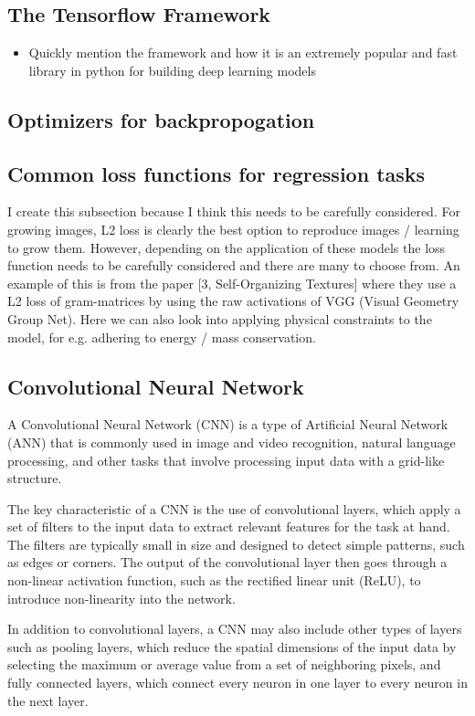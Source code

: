 \subsection{The Tensorflow Framework}
\begin{itemize}
	\item Quickly mention the framework and how it is an extremely popular and fast library in python for building deep learning models
\end{itemize}
\subsection{Optimizers for backpropogation}
\subsection{Common loss functions for regression tasks}
I create this subsection because I think this needs to be carefully considered. For growing images, L2
loss is clearly the best option to reproduce images / learning to grow them. However, depending on
the application of these models the loss function needs to be carefully considered and there are many
to choose from. An example of this is from the paper [3, Self-Organizing Textures] where they use a
L2 loss of gram-matrices by using the raw activations of VGG (Visual Geometry Group Net).
Here we can also look into applying physical constraints to the model, for e.g. adhering to energy
/ mass conservation.
\subsection{Convolutional Neural Network}

A Convolutional Neural Network (CNN) is a type of Artificial Neural Network (ANN) that is commonly used in image and video recognition, natural language processing, and other tasks that involve processing input data with a grid-like structure.

The key characteristic of a CNN is the use of convolutional layers, which apply a set of filters to the input data to extract relevant features for the task at hand. The filters are typically small in size and designed to detect simple patterns, such as edges or corners. The output of the convolutional layer then goes through a non-linear activation function, such as the rectified linear unit (ReLU), to introduce non-linearity into the network.

In addition to convolutional layers, a CNN may also include other types of layers such as pooling layers, which reduce the spatial dimensions of the input data by selecting the maximum or average value from a set of neighboring pixels, and fully connected layers, which connect every neuron in one layer to every neuron in the next layer.

